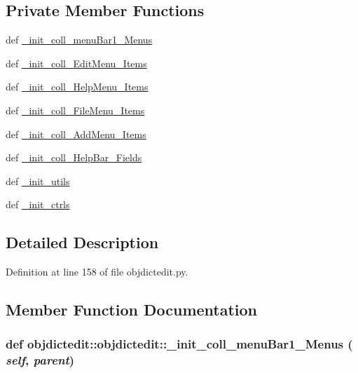 \subsection*{Private Member Functions}
\begin{CompactItemize}
\item 
def \hyperlink{classobjdictedit_1_1objdictedit_106e911cf82219438516ee23864651ec}{\_\-init\_\-coll\_\-menu\-Bar1\_\-Menus}
\item 
def \hyperlink{classobjdictedit_1_1objdictedit_ff8d7ea6744ddf274fc66869b0dd8d5d}{\_\-init\_\-coll\_\-Edit\-Menu\_\-Items}
\item 
def \hyperlink{classobjdictedit_1_1objdictedit_d939c47145a0e3275963bde016228f28}{\_\-init\_\-coll\_\-Help\-Menu\_\-Items}
\item 
def \hyperlink{classobjdictedit_1_1objdictedit_8312a8842d9983e18f47e32cb66a4cbd}{\_\-init\_\-coll\_\-File\-Menu\_\-Items}
\item 
def \hyperlink{classobjdictedit_1_1objdictedit_08471670ebefa572813c703c693d367c}{\_\-init\_\-coll\_\-Add\-Menu\_\-Items}
\item 
def \hyperlink{classobjdictedit_1_1objdictedit_31a6b686f4415521baeb49e911d05eed}{\_\-init\_\-coll\_\-Help\-Bar\_\-Fields}
\item 
def \hyperlink{classobjdictedit_1_1objdictedit_a290085c41e1c25e1393e87d171b424e}{\_\-init\_\-utils}
\item 
def \hyperlink{classobjdictedit_1_1objdictedit_1e885afd5e31d2c6be0a0e70a79b417f}{\_\-init\_\-ctrls}
\end{CompactItemize}


\subsection{Detailed Description}




Definition at line 158 of file objdictedit.py.

\subsection{Member Function Documentation}
\hypertarget{classobjdictedit_1_1objdictedit_106e911cf82219438516ee23864651ec}{
\subsubsection[\_\-init\_\-coll\_\-menuBar1\_\-Menus]{\setlength{\rightskip}{0pt plus 5cm}def objdictedit::objdictedit::\_\-init\_\-coll\_\-menu\-Bar1\_\-Menus ( {\em self},  {\em parent})}}
\label{classobjdictedit_1_1objdictedit_106e911cf82219438516ee23864651ec}




